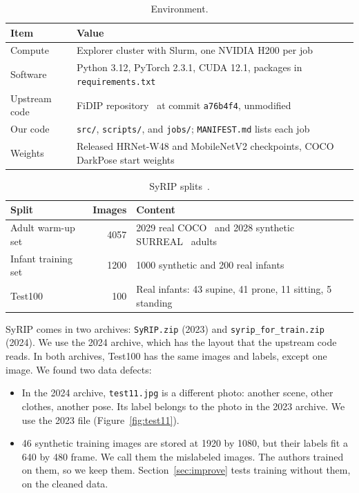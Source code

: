 \documentclass[11pt]{article}
\newcommand{\code}[1]{\texttt{#1}}
\begin{document}
\begin{table}[h]
\centering\small
\begin{tabular}{@{}ll@{}}
\toprule
Item & Value \\
\midrule
Compute & Explorer cluster with Slurm, one NVIDIA H200 per job \\
Software & Python 3.12, PyTorch 2.3.1, CUDA 12.1, packages in \code{requirements.txt} \\
Upstream code & FiDIP repository~\cite{fidipcode} at commit \code{a76b4f4}, unmodified \\
Our code & \code{src/}, \code{scripts/}, and \code{jobs/}; \code{MANIFEST.md} lists each job \\
Weights & Released HRNet-W48 and MobileNetV2 checkpoints, COCO DarkPose start weights \\
\bottomrule
\end{tabular}
\caption{Environment.}
\label{tab:env}
\end{table}

\begin{table}[h]
\centering\small
\begin{tabular}{@{}lrl@{}}
\toprule
Split & Images & Content \\
\midrule
Adult warm-up set & 4057 & 2029 real COCO~\cite{lin2014coco} and 2028 synthetic SURREAL~\cite{varol2017surreal} adults \\
Infant training set & 1200 & 1000 synthetic and 200 real infants \\
Test100 & 100 & Real infants: 43 supine, 41 prone, 11 sitting, 5 standing \\
\bottomrule
\end{tabular}
\caption{SyRIP splits~\cite{syrip}.}
\label{tab:data}
\end{table}

SyRIP comes in two archives: \code{SyRIP.zip} (2023) and \code{syrip\_for\_train.zip} (2024).
We use the 2024 archive, which has the layout that the upstream code reads.
In both archives, Test100 has the same images and labels, except one image.
We found two data defects:
\begin{itemize}
  \item In the 2024 archive, \code{test11.jpg} is a different photo: another scene, other clothes, another pose. Its label belongs to the photo in the 2023 archive. We use the 2023 file (Figure~\ref{fig:test11}).
  \item 46 synthetic training images are stored at 1920 by 1080, but their labels fit a 640 by 480 frame. We call them the mislabeled images. The authors trained on them, so we keep them. Section~\ref{sec:improve} tests training without them, on the cleaned data.
\end{itemize}
\end{document}
